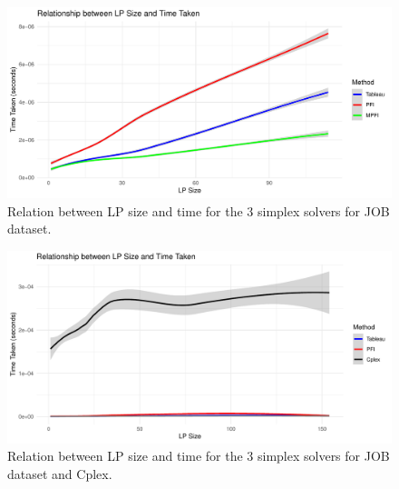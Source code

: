\begin{figure}[!htb]
    \centering
    \includegraphics[width=\textwidth]{figures/job_methods_time.pdf}
    \caption{Relation between LP size and time for the 3 simplex solvers for JOB dataset.}
    \label{fig:lp_size_vs_time_job}
\end{figure}

\begin{figure}[!htb]
    \centering
    \includegraphics[width=\textwidth]{figures/cplex_vs_all_job.pdf}
    \caption{Relation between LP size and time for the 3 simplex solvers for JOB dataset and Cplex.}
    \label{fig:lp_size_vs_time_cplex_job}
\end{figure}


